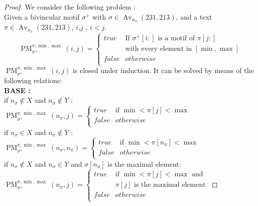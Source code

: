 \documentclass[a4paper]{llncs}
\DeclareMathOperator{\Avd}{Av}
\newcommand\Av[2]{\Avd_{{#1}}({#2})}
\newcommand{\ptext}{\pi}
\newcommand{\pmotif}{\sigma}
\newcommand{\x}{X}
\newcommand{\y}{Y}
\newcommand{\pbmotif}{\pmotif^+}
\DeclareMathOperator{\PMa}{PM}
\newcommand{\PM}[6]{\PMa_{{#1}}^{{#2},{#3},{#4}}({#5},{#6})}
\begin{document}
\begin{proof}
We consider the following problem :\\
Given a bivincular motif $\pbmotif$ with $\pmotif \in \Av{n_\pmotif}{231,213} $, and a text $\ptext \in \Av{n_\ptext}{231,213}$, $i$,$j$ , $i<j$.\\
$$
\PM{\pbmotif}{\ptext}{\min}{\max}{i}{j}=
\begin{cases}
	true 	& \text{If $\pbmotif[i:]$ is a motif of $\ptext[j:]$}\\
			  & \text{with every element in $[\min,\max]$}\\
	false 	& otherwise\\
\end{cases}
$$
$\PM{\pbmotif}{\ptext}{\min}{\max}{i}{j}$ is closed under induction.
It can be solved by means of the following relations:\\

\textbf{BASE :} \\
if $n_\pmotif \notin  \x $ and $n_\pmotif \notin  \y$ : \\
$
\PM{\pbmotif}{\ptext}{\min}{\max}{n_\pmotif}{j} =
\begin{cases}
	true 	& \text{if $\min<\ptext[j]<\max$}\\
	false 	& otherwise\\
\end{cases}
$
\\

if $n_\pmotif \in  \x $ and $n_\pmotif \notin  \y$ : \\
$
\PM{\pbmotif}{\ptext}{\min}{\max}{n_\pmotif}{n_\ptext} =
\begin{cases}
	true 	& \text{if $\min<\ptext[n_\ptext]<\max$}\\
	false 	& otherwise\\
\end{cases}
$
\\

if $n_\pmotif \notin  \x$  and $n_\pmotif \in  \y$ and $\pmotif[n_\pmotif]$ is the maximal element: \\
$
\PM{\pbmotif}{\ptext}{\min}{\max}{n_\pmotif}{j}=
\begin{cases}
	true 	& \text{if $\min<\ptext[j]<\max$ and }\\
			&\text{$\ptext[j]$ is the maximal element}\\
	false 	& otherwise\\
\end{cases}
$


\end{proof}
\end{document}
